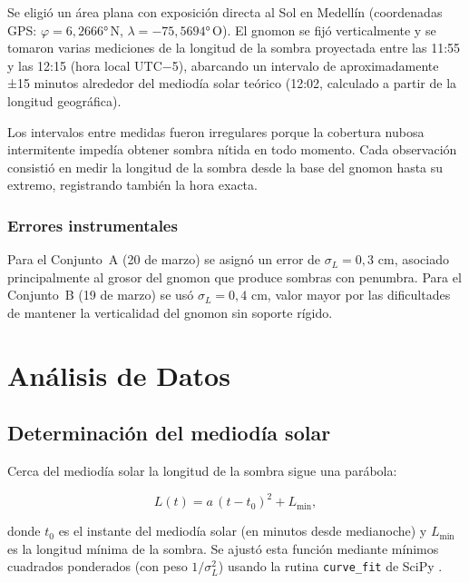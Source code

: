 \documentclass[stu,12pt,floatsintext]{apa7}
\begin{document}
Se eligió un área plana con exposición directa al Sol en Medellín (coordenadas
GPS: $\varphi = 6{,}2666°\,\text{N}$, $\lambda = -75{,}5694°\,\text{O}$).
El gnomon se fijó verticalmente y se tomaron varias mediciones de la longitud de la sombra
proyectada entre las 11:55 y las 12:15 (hora local UTC−5), abarcando un intervalo
de aproximadamente ±15 minutos alrededor del mediodía solar teórico (12:02, calculado a
partir de la longitud geográfica).

Los intervalos entre medidas fueron irregulares porque la cobertura nubosa intermitente
impedía obtener sombra nítida en todo momento. Cada observación consistió en medir la
longitud de la sombra desde la base del gnomon hasta su extremo, registrando también la
hora exacta.

\subsubsection*{Errores instrumentales}

Para el Conjunto~A (20 de marzo) se asignó un error de $\sigma_L = 0{,}3$ cm, asociado
principalmente al grosor del gnomon que produce sombras con penumbra. Para el
Conjunto~B (19 de marzo) se usó $\sigma_L = 0{,}4$ cm, valor mayor por las dificultades
de mantener la verticalidad del gnomon sin soporte rígido.

\section{Análisis de Datos}

\subsection{Determinación del mediodía solar}

Cerca del mediodía solar la longitud de la sombra sigue una parábola:

\begin{equation}
    L(t) = a\,(t - t_0)^2 + L_{\min},
    \label{eq:parabola}
\end{equation}

donde $t_0$ es el instante del mediodía solar (en minutos desde medianoche) y $L_{\min}$ es
la longitud mínima de la sombra. Se ajustó esta función mediante mínimos cuadrados
ponderados (con peso $1/\sigma_L^2$) usando la rutina \texttt{curve\_fit} de SciPy
\parencite{virtanen2020scipy}.
\end{document}
